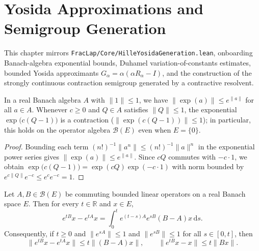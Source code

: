 \chapter{Yosida Approximations and Semigroup Generation}

This chapter mirrors \texttt{FracLap/Core/HilleYosidaGeneration.lean}, onboarding Banach-algebra exponential bounds, Duhamel variation-of-constants estimates, bounded Yosida approximants $G_\alpha = \alpha(\alpha R_\alpha - I)$, and the construction of the strongly continuous contraction semigroup generated by a contractive resolvent.

\begin{lemma}\label{lem:banach_exp_contraction}
\leanok
In a real Banach algebra $A$ with $\lVert 1 \rVert \le 1$, we have $\lVert \exp(a) \rVert \le e^{\lVert a \rVert}$ for all $a \in A$. Whenever $c \ge 0$ and $Q \in A$ satisfies $\lVert Q \rVert \le 1$, the exponential $\exp\bigl(c(Q - 1)\bigr)$ is a contraction ($\lVert \exp(c(Q - 1)) \rVert \le 1$); in particular, this holds on the operator algebra $\mathcal{B}(E)$ even when $E = \{0\}$.
\end{lemma}

\begin{proof}
\leanok
Bounding each term $(n!)^{-1} \lVert a^n \rVert \le (n!)^{-1} \lVert a \rVert^n$ in the exponential power series gives $\lVert \exp(a) \rVert \le e^{\lVert a \rVert}$. Since $cQ$ commutes with $-c \cdot 1$, we obtain $\exp\bigl(c(Q - 1)\bigr) = \exp(cQ) \exp(-c \cdot 1)$ with norm bounded by $e^{c \lVert Q \rVert} e^{-c} \le e^c e^{-c} = 1$.
\end{proof}

\begin{lemma}\label{lem:duhamel_estimate}
\leanok
Let $A, B \in \mathcal{B}(E)$ be commuting bounded linear operators on a real Banach space $E$. Then for every $t \in \mathbb{R}$ and $x \in E$,
\[
  e^{tB} x - e^{tA} x = \int_0^t e^{(t - s)A} e^{sB} (B - A) x\, \mathrm{d}s.
\]
Consequently, if $t \ge 0$ and $\lVert e^{sA} \rVert \le 1$ and $\lVert e^{sB} \rVert \le 1$ for all $s \in [0, t]$, then
\[
  \lVert e^{tB} x - e^{tA} x \rVert \le t \lVert (B - A) x \rVert, \qquad \lVert e^{tB} x - x \rVert \le t \lVert B x \rVert.
\]
\end{lemma}

